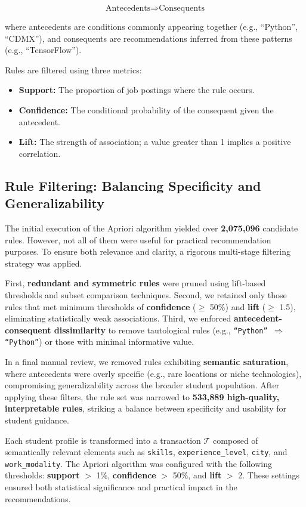 \documentclass{svproc} %
\begin{document}
	\[
	\text{Antecedents} \Rightarrow \text{Consequents}
	\]
	
	where antecedents are conditions commonly appearing together (e.g., ``Python'', ``CDMX''), and consequents are recommendations inferred from these patterns (e.g., ``TensorFlow'').
	
	Rules are filtered using three metrics:
	\begin{itemize}
		\item \textbf{Support:} The proportion of job postings where the rule occurs.
		\item \textbf{Confidence:} The conditional probability of the consequent given the antecedent.
		\item \textbf{Lift:} The strength of association; a value greater than 1 implies a positive correlation.
	\end{itemize}
	
	\subsection{Rule Filtering: Balancing Specificity and Generalizability}
	
	The initial execution of the Apriori algorithm yielded over \textbf{2,075,096} candidate rules. However, not all of them were useful for practical recommendation purposes. To ensure both relevance and clarity, a rigorous multi-stage filtering strategy was applied.
	
	First, \textbf{redundant and symmetric rules} were pruned using lift-based thresholds and subset comparison techniques. Second, we retained only those rules that met minimum thresholds of \textbf{confidence} ($\geq$ 50\%) and \textbf{lift} ($\geq$ 1.5), eliminating statistically weak associations. Third, we enforced \textbf{antecedent-consequent dissimilarity} to remove tautological rules (e.g., \texttt{“Python” $\Rightarrow$ “Python”}) or those with minimal informative value.
	
	In a final manual review, we removed rules exhibiting \textbf{semantic saturation}, where antecedents were overly specific (e.g., rare locations or niche technologies), compromising generalizability across the broader student population. After applying these filters, the rule set was narrowed to \textbf{533,889 high-quality, interpretable rules}, striking a balance between specificity and usability for student guidance.
	
	Each student profile is transformed into a transaction $\mathcal{T}$ composed of semantically relevant elements such as \texttt{skills}, \texttt{experience\_level}, \texttt{city}, and \texttt{work\_modality}. The Apriori algorithm was configured with the following thresholds: \textbf{support} $>$ 1\%, \textbf{confidence} $>$ 50\%, and \textbf{lift} $>$ 2. These settings ensured both statistical significance and practical impact in the recommendations.
	
\end{document}
